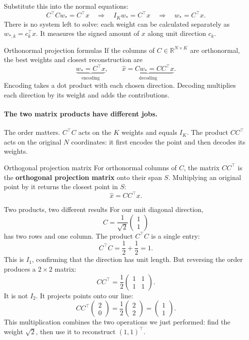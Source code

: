 \documentclass[a4paper,12pt,oneside]{report}
\begin{document}
Substitute this into the normal equations:
\[
  C^\top Cw_*=C^\top x
  \quad\Longrightarrow\quad
  I_Kw_*=C^\top x
  \quad\Longrightarrow\quad
  w_*=C^\top x.
\]
There is no system left to solve: each weight can be calculated
separately as $w_{*,k}=c_k^\top x$. It measures the signed amount
of $x$ along unit direction $c_k$.

\begin{framedprop}{Orthonormal projection formulas}
If the columns of $C\in\mathbb{R}^{N\times K}$ are orthonormal,
the best weights and closest reconstruction are
\[
  \underbrace{w_*=C^\top x}_{\text{encoding}},\qquad
  \underbrace{\hat{x}=Cw_*=CC^\top x}_{\text{decoding}}.
\]
Encoding takes a dot product with each chosen direction. Decoding
multiplies each direction by its weight and adds the contributions.
\end{framedprop}

\paragraph{The two matrix products have different jobs.}
The order matters. $C^\top C$ acts on the $K$ weights and equals
$I_K$. The product $CC^\top$ acts on the original $N$ coordinates:
it first encodes the point and then decodes its weights.

\begin{frameddefn}{Orthogonal projection matrix}\label{def:orthogonal-projection-matrix}
For orthonormal columns of $C$, the matrix $CC^\top$ is the
\textbf{orthogonal projection matrix} onto their span $S$.
Multiplying an original point by it returns the closest point in $S$:
\[
  \hat{x}=CC^\top x.
\]
\end{frameddefn}

\begin{framedexample}{Two products, two different results}
For our unit diagonal direction,
\[
  C=\frac{1}{\sqrt2}\begin{pmatrix}1\\1\end{pmatrix}
\]
has two rows and one column. The product $C^\top C$ is a single entry:
\[
  C^\top C=\frac12+\frac12=1.
\]
This is $I_1$, confirming that the direction has unit length.
But reversing the order produces a $2\times2$ matrix:
\[
  CC^\top=\frac12\begin{pmatrix}1&1\\1&1\end{pmatrix}.
\]
It is not $I_2$. It projects points onto our line:
\[
  CC^\top\begin{pmatrix}2\\0\end{pmatrix}
  =\frac12\begin{pmatrix}2\\2\end{pmatrix}
  =\begin{pmatrix}1\\1\end{pmatrix}.
\]
This multiplication combines the two operations we just performed:
find the weight $\sqrt2$, then use it to reconstruct $(1,1)^\top$.
\end{framedexample}
\end{document}
